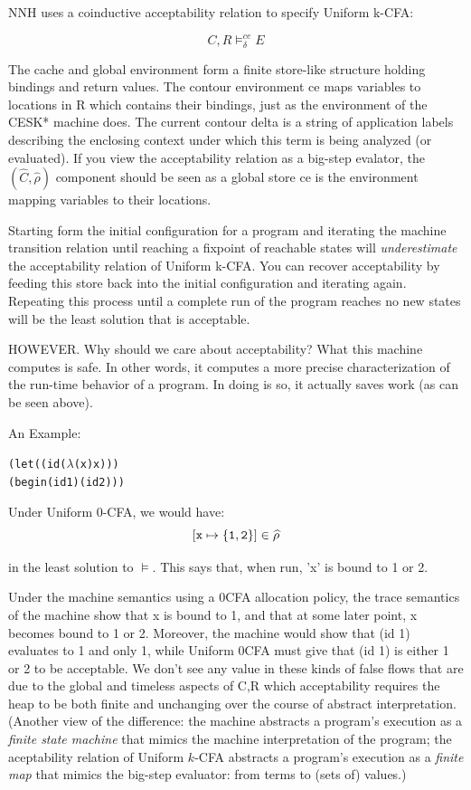 \documentclass[preprint,onecolumn,9pt]{sigplanconf} %
\begin{document}
NNH uses a coinductive acceptability relation to specify Uniform
k-CFA:

\[
   C,R \models^{ce}_\delta E
\]

The cache and global environment form a finite store-like structure
holding bindings and return values.  The contour environment ce maps
variables to locations in R which contains their bindings, just as the
environment of the CESK* machine does.  The current contour delta is a
string of application labels describing the enclosing context under
which this term is being analyzed (or evaluated).  If you view the
acceptability relation as a big-step evalator, the
$(\widehat C,\widehat\rho)$ component should be seen as a global
store ce is the environment mapping variables to their locations.

Starting form the initial configuration for a program and iterating
the machine transition relation until reaching a fixpoint of reachable
states will \emph{underestimate} the acceptability relation of Uniform
k-CFA.  You can recover acceptability by feeding this store back into
the initial configuration and iterating again.  Repeating this process
until a complete run of the program reaches no new states will be the
least solution that is acceptable.

HOWEVER.  Why should we care about acceptability?  What this
machine computes is safe.  In other words, it computes a more
precise characterization of the run-time behavior of a program.  In
doing is so, it actually saves work (as can be seen above).

An Example:

\begin{alltt}
 (let ((id (\(\lambda\) (x) x)))
   (begin (id 1) (id 2)))
\end{alltt}

Under Uniform 0-CFA, we would have:
\[
   [{\tt x} \mapsto \{{\tt 1}, {\tt 2}\}] \in \widehat\rho
\]

in the least solution to $\models$.  This says that, when run, 'x' is
bound to 1 or 2.

Under the machine semantics using a 0CFA allocation policy, the trace
semantics of the machine show that x is bound to 1, and that at some
later point, x becomes bound to 1 or 2.  Moreover, the machine would
show that (id 1) evaluates to 1 and only 1, while Uniform 0CFA must
give that (id 1) is either 1 or 2 to be acceptable.  We don't see any
value in these kinds of false flows that are due to the global and
timeless aspects of C,R which acceptability requires the heap to be
both finite and unchanging over the course of abstract
interpretation. (Another view of the difference: the machine abstracts
a program's execution as a \emph{finite state machine} that mimics the
machine interpretation of the program; the aceptability relation of
Uniform \(k\)-CFA abstracts a program's execution as a \emph{finite
  map} that mimics the big-step evaluator: from terms to (sets of)
values.)
\end{document}
